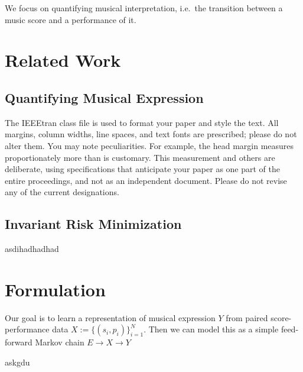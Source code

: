 \documentclass[conference]{IEEEtran}
\begin{document}
We focus on quantifying musical interpretation, i.e.\ the transition between a music score and a performance of it.


\section{Related Work}

\subsection{Quantifying Musical Expression}

The IEEEtran class file is used to format your paper and style the text. All margins,
column widths, line spaces, and text fonts are prescribed; please do not
alter them. You may note peculiarities. For example, the head margin
measures proportionately more than is customary. This measurement
and others are deliberate, using specifications that anticipate your paper
as one part of the entire proceedings, and not as an independent document.
Please do not revise any of the current designations.

\subsection{Invariant Risk Minimization}
asdihadhadhad

\section{Formulation}

Our goal is to learn a representation of musical expression \(Y\) from paired score-performance data \(X := \{(s_i, p_i)\}_{i=1}^N\). Then we can model this as a simple feed-forward Markov chain \(E \rightarrow X \rightarrow Y \)


\begin{thebibliography}{00}
     askgdu
\end{thebibliography}
\vspace{12pt}
\end{document}
